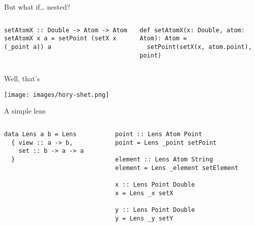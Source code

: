 \documentclass[presentation,aspectratio=169,8pt]{beamer}
\begin{document}
\begin{frame}[label={sec:orgbf87725},fragile]{But what if\ldots{} nested?}
 \begin{columns}
\begin{column}{0.5\columnwidth}
\begin{verbatim}
setAtomX :: Double -> Atom -> Atom
setAtomX x a = setPoint (setX x (_point a)) a
\end{verbatim}
\end{column}

\begin{column}{0.5\columnwidth}
\begin{verbatim}
def setAtomX(x: Double, atom: Atom): Atom =
  setPoint(setX(x, atom.point), point)
\end{verbatim}
\end{column}
\end{columns}
\end{frame}

\begin{frame}[label={sec:org62316a9}]{Well, that's}
\begin{center}
\texttt{[image: images/hory-shet.png]}
\end{center}
\end{frame}

\begin{frame}[label={sec:orgccd9ffb},fragile]{A simple lens}
 \begin{columns}
\begin{column}{0.5\columnwidth}
\begin{verbatim}
data Lens a b = Lens
  { view :: a -> b,
    set :: b -> a -> a
  }
\end{verbatim}
\end{column}

\begin{column}{0.5\columnwidth}
\pause

\begin{verbatim}
point :: Lens Atom Point
point = Lens _point setPoint

element :: Lens Atom String
element = Lens _element setElement

x :: Lens Point Double
x = Lens _x setX

y :: Lens Point Double
y = Lens _y setY
\end{verbatim}
\end{column}
\end{columns}
\end{frame}
\end{document}
